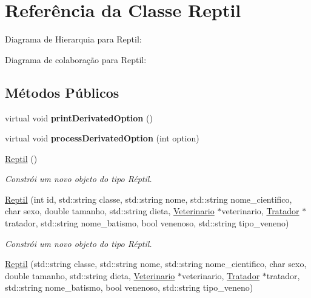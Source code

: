 \hypertarget{classReptil}{}\section{Referência da Classe Reptil}
\label{classReptil}


Diagrama de Hierarquia para Reptil\+:


Diagrama de colaboração para Reptil\+:
\subsection*{Métodos Públicos}
\begin{DoxyCompactItemize}
\item 
\mbox{\label{classReptil_ac73f3e8ad8494d54ded330a565e8bb17}} 
virtual void {\bfseries print\+Derivated\+Option} ()
\item 
\mbox{\label{classReptil_a8ebf6126a686b7260317b2996cf6d1b2}} 
virtual void {\bfseries process\+Derivated\+Option} (int option)
\item 
\mbox{\label{classReptil_a8d4e391e335678b7ed64eda95e050553}} 
\hyperlink{classReptil_a8d4e391e335678b7ed64eda95e050553}{Reptil} ()
\begin{DoxyCompactList}\small\item\em Constrói um novo objeto do tipo Réptil. \end{DoxyCompactList}\item 
\hyperlink{classReptil_a5bd50bf15e8ee41022daf6b12d9c880e}{Reptil} (int id, std\+::string classe, std\+::string nome, std\+::string nome\+\_\+cientifico, char sexo, double tamanho, std\+::string dieta, \hyperlink{classVeterinario}{Veterinario} $\ast$veterinario, \hyperlink{classTratador}{Tratador} $\ast$tratador, std\+::string nome\+\_\+batismo, bool venenoso, std\+::string tipo\+\_\+veneno)
\begin{DoxyCompactList}\small\item\em Constrói um novo objeto do tipo Réptil. \end{DoxyCompactList}\item 
\hyperlink{classReptil_a5cf1117f6898fcc0a9e0ce9aed4a446c}{Reptil} (std\+::string classe, std\+::string nome, std\+::string nome\+\_\+cientifico, char sexo, double tamanho, std\+::string dieta, \hyperlink{classVeterinario}{Veterinario} $\ast$veterinario, \hyperlink{classTratador}{Tratador} $\ast$tratador, std\+::string nome\+\_\+batismo, bool venenoso, std\+::string tipo\+\_\+veneno)

\end{DoxyCompactItemize}
